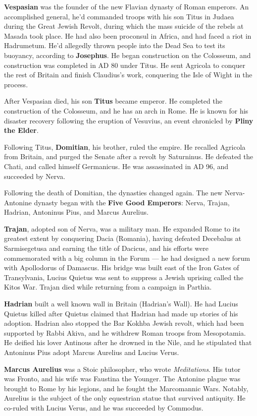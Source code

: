 \textbf{Vespasian} was the founder of the new Flavian dynasty of Roman emperors.
An accomplished general, he'd commanded troops with his son Titus in Judaea during the Great Jewish Revolt,
during which the mass suicide of the rebels at Masada took place.
He had also been proconsul in Africa, and had faced a riot in Hadrumetum.
He'd allegedly thrown people into the Dead Sea to test its buoyancy, according to \textbf{Josephus}.
He began construction on the Colosseum, and construction was completed in AD 80 under Titus.
He sent Agricola to conquer the rest of Britain and finish Claudius's work,
conquering the Isle of Wight in the process.

After Vespasian died, his son \textbf{Titus} became emperor.
He completed the construction of the Colosseum, and he has an arch in Rome.
He is known for his disaster recovery following the eruption of Vesuvius,
an event chronicled by \textbf{Pliny the Elder}.

Following Titus, \textbf{Domitian}, his brother, ruled the empire.
He recalled Agricola from Britain, and purged the Senate after a revolt by Saturninus.
He defeated the Chati, and called himself Germanicus.
He was assassinated in AD 96, and succeeded by Nerva.

Following the death of Domitian, the dynasties changed again.
The new Nerva-Antonine dynasty began with the \textbf{Five Good Emperors}:
Nerva, Trajan, Hadrian, Antoninus Pius, and Marcus Aurelius.

\textbf{Trajan}, adopted son of Nerva, was a military man.
He expanded Rome to its greatest extent by conquering Dacia (Romania),
having defeated Decebalus at Sarmisegetusa and earning the title of Dacicus,
and his efforts were commemorated with a big column in the Forum ---
he had designed a new forum with Apollodorus of Damascus.
His bridge was built east of the Iron Gates of Transylvania,
Lucius Quietus was sent to suppress a Jewish uprising called the Kitos War.
Trajan died while returning from a campaign in Parthia.

\textbf{Hadrian} built a well known wall in Britain (Hadrian's Wall).
He had Lucius Quietus killed after Quietus claimed that Hadrian had made up stories of his adoption.
Hadrian also stopped the Bar Kokhba Jewish revolt, which had been supported by Rabbi Akiva,
and he withdrew Roman troops from Mesopotamia.
He deified his lover Antinous after he drowned in the Nile,
and he stipulated that Antoninus Pius adopt Marcus Aurelius and Lucius Verus.

\textbf{Marcus Aurelius} was a Stoic philosopher, who wrote \textit{Meditations}.
His tutor was Fronto, and his wife was Faustina the Younger.
The Antonine plague was brought to Rome by his legions,
and he fought the Marcomannic Wars.
Notably, Aurelius is the subject of the only equestrian statue that survived antiquity.
He co-ruled with Lucius Verus, and he was succeeded by Commodus.

